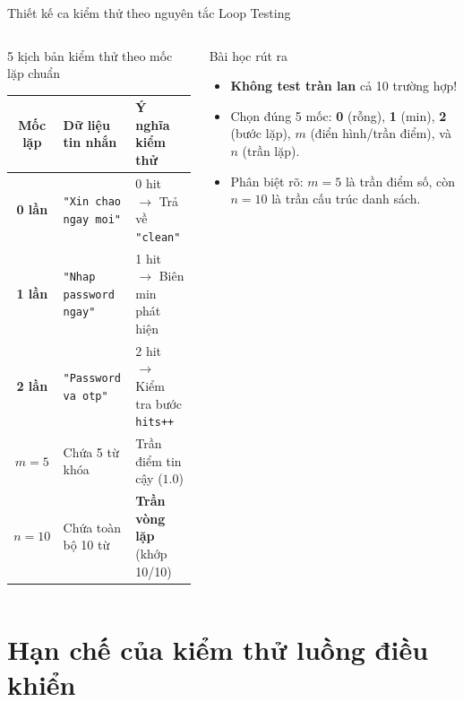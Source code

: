 \documentclass[aspectratio=169,12pt]{beamer}
\begin{document}
\begin{frame}{Thiết kế ca kiểm thử theo nguyên tắc Loop Testing}
  \begin{columns}[T]
    \begin{block}{\small 5 kịch bản kiểm thử theo mốc lặp chuẩn}
      \scriptsize
      \renewcommand{\arraystretch}{1.2}
      \begin{tabularx}{\linewidth}{@{}c l X@{}}
        \toprule
        \textbf{Mốc lặp} & \textbf{Dữ liệu tin nhắn} & \textbf{Ý nghĩa kiểm thử} \\
        \midrule
        \textbf{0 lần} & \texttt{"Xin chao ngay moi"} & 0 hit $\to$ Trả về \texttt{"clean"} \\
        \textbf{1 lần} & \texttt{"Nhap password ngay"} & 1 hit $\to$ Biên min phát hiện \\
        \textbf{2 lần} & \texttt{"Password va otp"} & 2 hit $\to$ Kiểm tra bước \texttt{hits++} \\
        \textbf{$m = 5$} & Chứa 5 từ khóa & Trần điểm tin cậy ($1.0$) \\
        \textbf{$n = 10$} & Chứa toàn bộ 10 từ & \textbf{Trần vòng lặp} (khớp 10/10) \\
        \bottomrule
      \end{tabularx}
      \renewcommand{\arraystretch}{1}
    \end{block}

    \begin{exampleblock}{\small Bài học rút ra}
      \scriptsize
      \begin{itemize}\setlength{\itemsep}{0.25em}
        \item \textbf{Không test tràn lan} cả 10 trường hợp!
        \item Chọn đúng 5 mốc: \textbf{0} (rỗng), \textbf{1} (min), \textbf{2} (bước lặp), \textbf{$m$} (điển hình/trần điểm), và \textbf{$n$} (trần lặp).
        \item Phân biệt rõ: $m=5$ là trần điểm số, còn $n=10$ là trần cấu trúc danh sách.
      \end{itemize}
    \end{exampleblock}
  \end{columns}
\end{frame}

\section{Hạn chế của kiểm thử luồng điều khiển}
\end{document}

